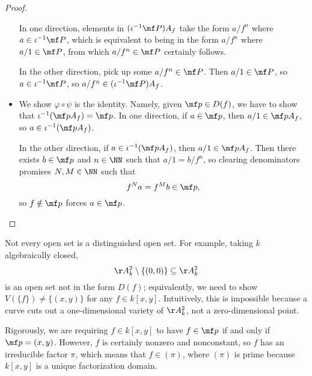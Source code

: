 \documentclass[../notes.tex]{subfiles}
\begin{document}
\begin{proof}
\begin{itemize}
		In one direction, elements in $(\iota^{-1}\mf P)A_f$ take the form $a/f^n$ where $a\in\iota^{-1}\mf P$, which is equivalent to being in the form $a/f^n$ where $a/1\in\mf P$, from which $a/f^n\in\mf P$ certainly follows.

		In the other direction, pick up some $a/f^n\in\mf P$. Then $a/1\in\mf P$, so $a\in\iota^{-1}\mf P$, so $a/f^n\in(\iota^{-1}\mf P)A_f$.

		\item We show $\varphi\circ\psi$ is the identity. Namely, given $\mf p\in D(f)$, we have to show that $\iota^{-1}(\mf pA_f)=\mf p$. In one direction, if $a\in\mf p$, then $a/1\in\mf pA_f$, so $a\in\iota^{-1}(\mf pA_f)$.
		
		In the other direction, if $a\in\iota^{-1}(\mf pA_f)$, then $a/1\in\mf pA_f$. Then there exists $b\in\mf p$ and $n\in\NN$ such that $a/1=b/f^n$, so clearing denominators promises $N,M\in\NN$ such that
		\[f^Na=f^Mb\in\mf p,\]
		so $f\notin\mf p$ forces $a\in\mf p$.
		\qedhere
	\end{itemize}
\end{proof}
\begin{remark}
	Not every open set is a distinguished open set. For example, taking $k$ algebraically closed,
	\[\AA^2_k\setminus\{(0,0)\}\subseteq\AA^2_k\]
	is an open set not in the form $D(f)$; equivalently, we need to show $V(\{f\})\ne\{(x,y)\}$ for any $f\in k[x,y]$. Intuitively, this is impossible because a curve cuts out a one-dimensional variety of $\AA^2_k$, not a zero-dimensional point.
	
	Rigorously, we are requiring $f\in k[x,y]$ to have $f\in\mf p$ if and only if $\mf p=(x,y)$. However, $f$ is certainly nonzero and nonconstant, so $f$ has an irreducible factor $\pi$, which means that $f\in(\pi)$, where $(\pi)$ is prime because $k[x,y]$ is a unique factorization domain.
\end{remark}
\end{document}
